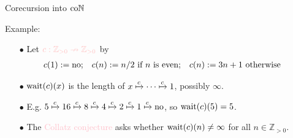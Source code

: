 \begin{frame}{Corecursion into $\mathrm{co}\mathbb{N}$} %
  
  \par Example:
  \begin{itemize}
    \item[$\bullet$] {
      Let $\textcolor{pink}{c : \mathbb{Z}_{> 0} \nto \mathbb{Z}_{> 0}}$ by
      \begin{align*}
        c(1) &:= \mathrm{no};
        & c(n) &:= n / 2 \text{ if } n \text{ is even};
        & c(n) &:= 3n + 1 \text{ otherwise}
      \end{align*}
      \vspace{-\baselineskip}
    }\pause
    \item[$\bullet$] {
      $\operatorname{wait}(c)(x)$ is the length of $x \xmapsto{c} \cdots \xmapsto{c} 1$, possibly $\infty$.
      \newline
    }\pause
    \item[$\bullet$] {
      E.g. $5 \xmapsto{c} 16 \xmapsto{c} 8 \xmapsto{c} 4 \xmapsto{c} 2 \xmapsto{c} 1 \xmapsto{c} \mathrm{no}$, so $\operatorname{wait}(c)(5) = 5$.
      \newline
    }\pause
    \item[$\bullet$] {
      The \textcolor{pink}{Collatz conjecture} asks whether $\operatorname{wait}(c)(n) \neq \infty$ for all $n \in \mathbb{Z}_{> 0}$.
    }
  \end{itemize}

\end{frame}

